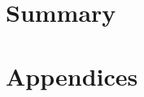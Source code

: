 \documentclass[english, online, cse, master]{dithesis} %
\providecommand{\DIFaddbegin}{} %
\providecommand{\DIFaddend}{} %
\providecommand{\DIFdelbegin}{} %
\providecommand{\DIFdelend}{} %
\begin{document}
\chapter{Summary}
  \label{summary}
  

\DIFdelbegin %
\DIFdelend \DIFaddbegin \printbibliography[heading=bibnumbered, title=\mybibname]
\DIFaddend 

\DIFaddbegin \startappendix
\DIFaddend \chapter{Appendices}
  
\end{document}
